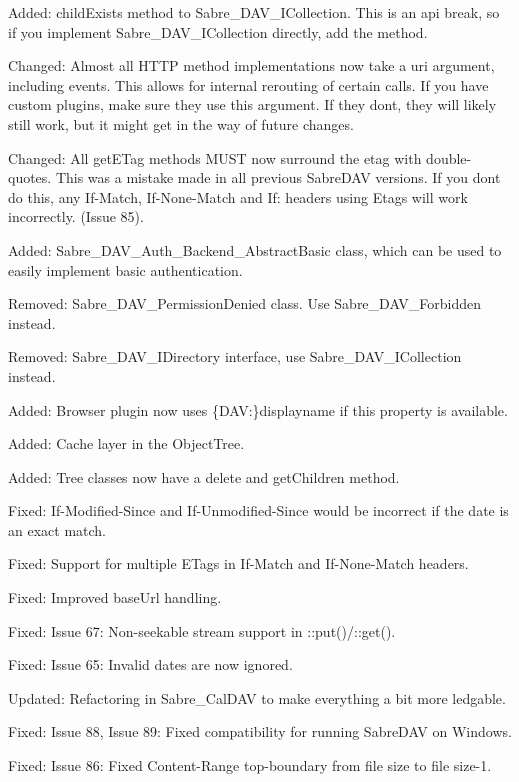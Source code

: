 \begin{DoxyItemize}
\item Added\+: child\+Exists method to Sabre\+\_\+\+D\+A\+V\+\_\+\+I\+Collection. This is an api break, so if you implement Sabre\+\_\+\+D\+A\+V\+\_\+\+I\+Collection directly, add the method.
\item Changed\+: Almost all H\+T\+TP method implementations now take a uri argument, including events. This allows for internal rerouting of certain calls. If you have custom plugins, make sure they use this argument. If they don\textquotesingle{}t, they will likely still work, but it might get in the way of future changes.
\item Changed\+: All get\+E\+Tag methods M\+U\+ST now surround the etag with double-\/quotes. This was a mistake made in all previous Sabre\+D\+AV versions. If you don\textquotesingle{}t do this, any If-\/\+Match, If-\/\+None-\/\+Match and If\+: headers using Etags will work incorrectly. (Issue 85).
\item Added\+: Sabre\+\_\+\+D\+A\+V\+\_\+\+Auth\+\_\+\+Backend\+\_\+\+Abstract\+Basic class, which can be used to easily implement basic authentication.
\item Removed\+: Sabre\+\_\+\+D\+A\+V\+\_\+\+Permission\+Denied class. Use Sabre\+\_\+\+D\+A\+V\+\_\+\+Forbidden instead.
\item Removed\+: Sabre\+\_\+\+D\+A\+V\+\_\+\+I\+Directory interface, use Sabre\+\_\+\+D\+A\+V\+\_\+\+I\+Collection instead.
\item Added\+: Browser plugin now uses \{D\+AV\+:\}displayname if this property is available.
\item Added\+: Cache layer in the Object\+Tree.
\item Added\+: Tree classes now have a delete and get\+Children method.
\item Fixed\+: If-\/\+Modified-\/\+Since and If-\/\+Unmodified-\/\+Since would be incorrect if the date is an exact match.
\item Fixed\+: Support for multiple E\+Tags in If-\/\+Match and If-\/\+None-\/\+Match headers.
\item Fixed\+: Improved base\+Url handling.
\item Fixed\+: Issue 67\+: Non-\/seekable stream support in \+::put()/\+::get().
\item Fixed\+: Issue 65\+: Invalid dates are now ignored.
\item Updated\+: Refactoring in Sabre\+\_\+\+Cal\+D\+AV to make everything a bit more ledgable.
\item Fixed\+: Issue 88, Issue 89\+: Fixed compatibility for running Sabre\+D\+AV on Windows.
\item Fixed\+: Issue 86\+: Fixed Content-\/\+Range top-\/boundary from \textquotesingle{}file size\textquotesingle{} to \textquotesingle{}file size\textquotesingle{}-\/1.
\end{DoxyItemize}

